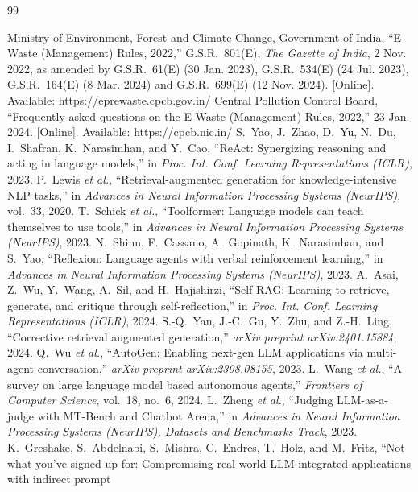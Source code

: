 \begin{thebibliography}{99}
 Ministry of Environment, Forest and Climate Change, Government of India,
``E-Waste (Management) Rules, 2022,'' G.S.R.~801(E), \emph{The Gazette of India}, 2 Nov. 2022, as amended
by G.S.R.~61(E) (30 Jan. 2023), G.S.R.~534(E) (24 Jul. 2023), G.S.R.~164(E) (8 Mar. 2024) and
G.S.R.~699(E) (12 Nov. 2024). [Online]. Available: https://eprewaste.cpcb.gov.in/
 Central Pollution Control Board, ``Frequently asked questions on the E-Waste
(Management) Rules, 2022,'' 23 Jan. 2024. [Online]. Available: https://cpcb.nic.in/
 S.~Yao, J.~Zhao, D.~Yu, N.~Du, I.~Shafran, K.~Narasimhan, and Y.~Cao,
``ReAct: Synergizing reasoning and acting in language models,'' in \emph{Proc. Int. Conf. Learning
Representations (ICLR)}, 2023.
 P.~Lewis \emph{et al.}, ``Retrieval-augmented generation for knowledge-intensive
NLP tasks,'' in \emph{Advances in Neural Information Processing Systems (NeurIPS)}, vol.~33, 2020.
 T.~Schick \emph{et al.}, ``Toolformer: Language models can teach
themselves to use tools,'' in \emph{Advances in Neural Information Processing Systems (NeurIPS)}, 2023.
 N.~Shinn, F.~Cassano, A.~Gopinath, K.~Narasimhan, and S.~Yao,
``Reflexion: Language agents with verbal reinforcement learning,'' in \emph{Advances in Neural
Information Processing Systems (NeurIPS)}, 2023.
 A.~Asai, Z.~Wu, Y.~Wang, A.~Sil, and H.~Hajishirzi, ``Self-RAG: Learning to
retrieve, generate, and critique through self-reflection,'' in \emph{Proc. Int. Conf. Learning
Representations (ICLR)}, 2024.
 S.-Q.~Yan, J.-C.~Gu, Y.~Zhu, and Z.-H.~Ling, ``Corrective retrieval augmented
generation,'' \emph{arXiv preprint arXiv:2401.15884}, 2024.
 Q.~Wu \emph{et al.}, ``AutoGen: Enabling next-gen LLM applications via
multi-agent conversation,'' \emph{arXiv preprint arXiv:2308.08155}, 2023.
 L.~Wang \emph{et al.}, ``A survey on large language model based autonomous
agents,'' \emph{Frontiers of Computer Science}, vol.~18, no.~6, 2024.
 L.~Zheng \emph{et al.}, ``Judging LLM-as-a-judge with MT-Bench and Chatbot
Arena,'' in \emph{Advances in Neural Information Processing Systems (NeurIPS), Datasets and Benchmarks
Track}, 2023.
 K.~Greshake, S.~Abdelnabi, S.~Mishra, C.~Endres, T.~Holz, and M.~Fritz,
``Not what you've signed up for: Compromising real-world LLM-integrated applications with indirect prompt

\end{thebibliography}
